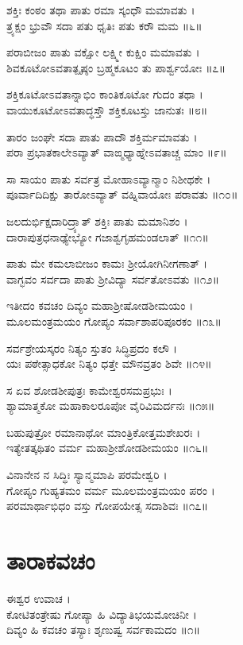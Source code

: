 ಶಕ್ತಿಃ ಕಂಠಂ ತಥಾ ಪಾತು ರಮಾ ಸ್ಕಂಧೌ ಮಮಾವತು ।\\
ತ್ರ್ಯಕ್ಷಂ ಭ್ರುವೌ ಸದಾ ಪತು ಧೃತಿಃ ಪತು ಕರೌ ಮಮ ॥೬॥

ಪರಾಬೀಜಂ ಪಾತು ವಕ್ಷೋ ಲಕ್ಷ್ಮೀ ಕುಕ್ಷಿಂ ಮಮಾವತು ।\\
ಶಿವಕೂಟೋಽವತಾತ್ಪೃಷ್ಠಂ ಬ್ರಹ್ಮಕೂಟಂ ತು ಪಾರ್ಶ್ವಯೋಃ ॥೭॥

ಶಕ್ತಿಕೂಟೋಽವತಾನ್ನಾಭಿಂ ಕಾಂತಿಕೂಟೋ ಗುದಂ ತಥಾ ।\\
ವಾಯುಕೂಟೋಽವತಾದ್ಧಸ್ತೌ ಶಕ್ತಿಕೂಟಸ್ತು ಜಾನುತಃ ॥೮॥

ತಾರಂ ಜಂಘೇ ಸದಾ ಪಾತು ಪಾದೌ ಶಕ್ತಿರ್ಮಮಾವತು ।\\
ಪರಾ ಪ್ರಭಾತಕಾಲೇಽವ್ಯಾತ್ ವಾಙ್ಮಧ್ಯಾಹ್ನೇಽವತಾಚ್ಚ ಮಾಂ ॥೯॥

ಸಾ ಸಾಯಂ ಪಾತು ಸರ್ವತ್ರ ಮೋಹಾಽವ್ಯಾನ್ಮಾಂ ನಿಶೀಥಕೇ ।\\
ಪೂರ್ವಾದಿದಿಕ್ಷು ತಾರೋಽವ್ಯಾತ್ ವಹ್ನಿವಾಯೋಃ ಪರಾವತು ॥೧೦॥

ಜಲದುರ್ಭಿಕ್ಷದಾರಿದ್ರ್ಯಾತ್ ಶಕ್ತಿಃ ಪಾತು ಮಮಾನಿಶಂ ।\\
ದಾರಾಪುತ್ರಧನಾಢ್ಯೇಭ್ಯೋ ಗಜಾಶ್ವಗೃಹಮಂಡಲಾತ್ ॥೧೧॥

ಪಾತು ಮೇ ಕಮಲಾಬೀಜಂ ಕಾಮಃ ಶ್ರೀಯೋಗಿನೀಗಣಾತ್ ।\\
ವಾಗ್ಭವಂ ಸರ್ವದಾ ಪಾತು ಶ್ರೀವಿದ್ಯಾ ಸರ್ವತೋಽವತು ॥೧೨॥

ಇತೀದಂ ಕವಚಂ ದಿವ್ಯಂ ಮಹಾಶ್ರೀಷೋಡಶೀಮಯಂ ।\\
ಮೂಲಮಂತ್ರಮಯಂ ಗೋಪ್ಯಂ ಸರ್ವಾಶಾಪರಿಪೂರಕಂ ॥೧೩॥

ಸರ್ವಶ್ರೇಯಸ್ಕರಂ ನಿತ್ಯಂ ಸ್ತುತಂ ಸಿದ್ಧಿಪ್ರದಂ ಕಲೌ ।\\
ಯಃ ಪಠೇತ್ಸಾಧಕೋ ನಿತ್ಯಂ ಧತ್ತೇ ಮೌನವ್ರತಂ ಶಿವೇ ॥೧೪॥

ಸ ಏವ ಶೋಡಶೀಪುತ್ರಃ ಕಾಮೇಶ್ವರಸಮಪ್ರಭುಃ ।\\
ಶ್ಯಾಮಾತ್ಮಕೋ ಮಹಾಕಾಲರೂಪೋ ವೈರಿವಿಮರ್ದನಃ ॥೧೫॥

ಬಹುಪುತ್ರೋ ರಮಾನಾಥೋ ಮಾಂತ್ರಿಕೋತ್ತಮಶೇಖರಃ ।\\
ಇತ್ಯೇತತ್ಕಥಿತಂ ವರ್ಮ ಮಹಾಶ್ರೀಶೋಡಶೀಮಯಂ ॥೧೬॥

ವಿನಾನೇನ ನ ಸಿದ್ಧಿಃ ಸ್ಯಾನ್ಮಮಾಪಿ ಪರಮೇಶ್ವರಿ ।\\
ಗೋಪ್ಯಂ ಗುಹ್ಯತಮಂ ವರ್ಮ ಮೂಲಮಂತ್ರಮಯಂ ಪರಂ ।\\
ಪರಮಾರ್ಥಾಭಿಧಂ ವಸ್ತು ಗೋಪಯೇತ್ಸ ಸದಾಶಿವಃ ॥೧೭॥
\section{ತಾರಾಕವಚಂ}
ಈಶ್ವರ ಉವಾಚ ।\\
ಕೋಟಿತಂತ್ರೇಷು ಗೋಪ್ಯಾ ಹಿ ವಿದ್ಯಾತಿಭಯಮೋಚಿನೀ ।\\
ದಿವ್ಯಂ ಹಿ ಕವಚಂ ತಸ್ಯಾಃ ಶೃಣುಷ್ವ ಸರ್ವಕಾಮದಂ ॥೧॥

